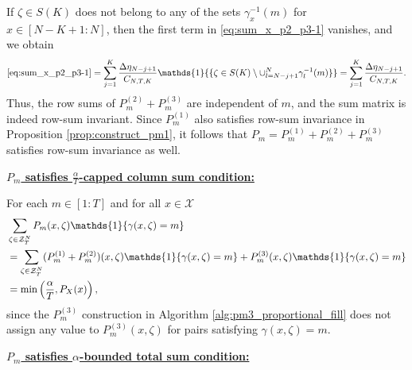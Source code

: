 \documentclass[11pt,letterpaper]{article}
\newcommand{\cX}{\mathcal{X}}
\newcommand{\cZ}{\mathcal{Z}}
\begin{document}
If $\zeta \in S(K)$ does not belong to any of the sets $\gamma_x^{-1}(m)$ for $x \in [N-K+1:N]$, then the first term in \eqref{eq:sum_x_p2_p3-1} vanishes, and we obtain
\begin{align}
    \eqref{eq:sum_x_p2_p3-1}
    = \sum_{j=1}^K \frac{\Delta\eta_{N-j+1}}{C_{N,T,K}}\mathds{1}{\{ \zeta \in S(K) \setminus \cup_{l= N-j+1}^N \gamma^{-1}_l(m)\}}
    = \sum_{j=1}^K \frac{\Delta\eta_{N-j+1}}{C_{N,T,K}}.
\end{align}
Thus, the row sums of $P_m^{(2)}+P_m^{(3)}$ are independent of $m$, and the sum matrix is indeed row-sum invariant. Since $P_m^{(1)}$ also satisfies row-sum invariance in Proposition \ref{prop:construct_pm1}, it follows that $P_m = P_m^{(1)}+P_m^{(2)}+P_m^{(3)}$ satisfies row-sum invariance as well.

\underline{\textbf{$P_m$ satisfies $\tfrac{\alpha}{T}$-capped column sum condition:}} 

For each $m \in [1:T]$ and for all $x \in \cX$
\begin{align}
    & \sum_{\zeta \in \cZ^N_T}P_m(x,\zeta) \mathds{1} \{ \gamma(x,\zeta) = m\} \notag \\
    & =  \sum_{\zeta \in \cZ^N_T}(P_m^{(1)}+P_m^{(2)})(x,\zeta) \mathds{1} \{ \gamma(x,\zeta) = m\} + P_m^{(3)}(x,\zeta) \mathds{1} \{ \gamma(x,\zeta) = m\} \notag \\
    & = \min \left(\frac{\alpha}{T} , P_X(x)\right), 
\end{align}
since the $P_m^{(3)}$ construction in Algorithm \ref{alg:pm3_proportional_fill} does not assign any value to $P_m^{(3)}(x,\zeta)$ for pairs satisfying $\gamma(x,\zeta) = m$. 

\underline{\textbf{$P_m$ satisfies $\alpha$-bounded total sum condition:}} \\
\end{document}
